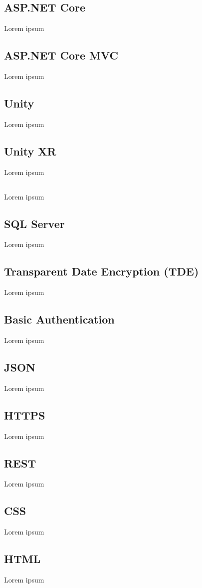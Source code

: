 \subsection*{ASP.NET Core}

Lorem ipsum

\subsection*{ASP.NET Core MVC}
Lorem ipsum
\subsection*{Unity}
Lorem ipsum
\subsection*{Unity XR}
Lorem ipsum
\subsection*{\C}
Lorem ipsum
\subsection*{SQL Server}
Lorem ipsum
\subsection*{Transparent Date Encryption (TDE)}
Lorem ipsum
\subsection*{Basic Authentication}
Lorem ipsum
\subsection*{JSON}
Lorem ipsum
\subsection*{HTTPS}
Lorem ipsum
\subsection*{REST}
Lorem ipsum
 \subsection*{CSS}
Lorem ipsum
\subsection*{HTML}
Lorem ipsum
